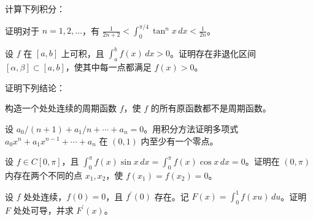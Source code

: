 \noindent\begin{minipage}{\textwidth}
计算下列积分：
\end{minipage}\par\vfill
\newpage
\noindent\begin{minipage}{\textwidth}
证明对于 $n=1,2,\ldots$，有 $\displaystyle\frac1{2n+2}<\int_0^{\pi/4}\tan^n x\,dx<\frac1{2n}$。
\end{minipage}\par\vfill
\noindent\begin{minipage}{\textwidth}
设 $f$ 在 $[a,b]$ 上可积，且 $\int_a^b f(x)\,dx>0$。证明存在非退化区间 $[\alpha,\beta]\subset[a,b]$，使其中每一点都满足 $f(x)>0$。
\end{minipage}\par\vfill
\noindent\begin{minipage}{\textwidth}
证明下列结论：
\end{minipage}\par\vfill
\noindent\begin{minipage}{\textwidth}
构造一个处处连续的周期函数 $f$，使 $f$ 的所有原函数都不是周期函数。
\end{minipage}\par\vfill
\newpage
\noindent\begin{minipage}{\textwidth}
设 $a_0/(n+1)+a_1/n+\cdots+a_n=0$。用积分方法证明多项式 $a_0x^n+a_1x^{n-1}+\cdots+a_n$ 在 $(0,1)$ 内至少有一个零点。
\end{minipage}\par\vfill
\noindent\begin{minipage}{\textwidth}
设 $f\in C[0,\pi]$，且 $\int_0^\pi f(x)\sin x\,dx=\int_0^\pi f(x)\cos x\,dx=0$。证明在 $(0,\pi)$ 内存在两个不同的点 $x_1,x_2$，使 $f(x_1)=f(x_2)=0$。
\end{minipage}\par\vfill
\noindent\begin{minipage}{\textwidth}
设 $f$ 处处连续，$f(0)=0$，且 $f^{\prime}(0)$ 存在。记 $F(x)=\int_0^1 f(xu)\,du$。证明 $F$ 处处可导，并求 $F^{\prime}(x)$。
\end{minipage}\par\vfill
